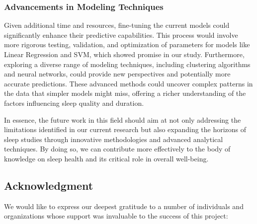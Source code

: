 \documentclass[conference]{IEEEtran}
\begin{document}
\subsubsection*{Advancements in Modeling Techniques}
Given additional time and resources, fine-tuning the current models could significantly enhance their predictive capabilities. This process would involve more rigorous testing, validation, and optimization of parameters for models like Linear Regression and SVM, which showed promise in our study. Furthermore, exploring a diverse range of modeling techniques, including clustering algorithms and neural networks, could provide new perspectives and potentially more accurate predictions. These advanced methods could uncover complex patterns in the data that simpler models might miss, offering a richer understanding of the factors influencing sleep quality and duration.

In essence, the future work in this field should aim at not only addressing the limitations identified in our current research but also expanding the horizons of sleep studies through innovative methodologies and advanced analytical techniques. By doing so, we can contribute more effectively to the body of knowledge on sleep health and its critical role in overall well-being.


\subsection*{Acknowledgment}

We would like to express our deepest gratitude to a number of individuals and organizations whose support was invaluable to the success of this project:
\end{document}
